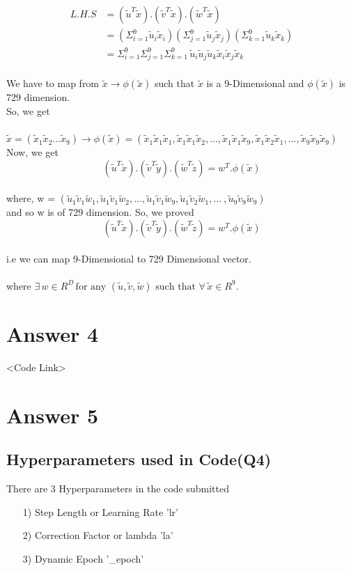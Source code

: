 \documentclass{article}
\begin{document}
\begin{align*} 
L.H.S & = (\tilde{u}^T\tilde{x}).(\tilde{v}^T\tilde{x}).(\tilde{w}^T\tilde{x})\\
& = (\Sigma_{i=1}^9 \tilde{u}_i\tilde{x}_i)(\Sigma_{j=1}^9 \tilde{u}_j\tilde{x}_j)(\Sigma_{k=1}^9 \tilde{u}_k\tilde{x}_k)\\
& = \Sigma_{i=1}^9\Sigma_{j=1}^9\Sigma_{k=1}^9 \, \tilde{u}_i\tilde{u}_j\tilde{u}_k\tilde{x}_i\tilde{x}_j\tilde{x}_k\\
\end{align*}

We have to map from $\tilde{x} \to \phi(\tilde{x})$ such that $\tilde{x}$ is a 9-Dimensional and $\phi(\tilde{x})$ is 729 dimension.\\
So, we get\\\\
$\tilde{x} = (\tilde{x}_1\tilde{x}_2 \dots \tilde{x}_9) \to\phi(\tilde{x}) = (\tilde{x}_1\tilde{x}_1\tilde{x}_1, \tilde{x}_1\tilde{x}_1\tilde{x}_2, \dots , \tilde{x}_1\tilde{x}_1\tilde{x}_9, \tilde{x}_1\tilde{x}_2\tilde{x}_1, \dots ,\tilde{x}_9\tilde{x}_9\tilde{x}_9) $\\

Now, we get
\[(\tilde{u}^T\tilde{x}).(\tilde{v}^T\tilde{y}).(\tilde{w}^T\tilde{z}) = w^T.\phi(\tilde{x})\]\\
where, w = $(\tilde{u}_1\tilde{v}_1\tilde{w}_1, \tilde{u}_1\tilde{v}_1\tilde{w}_2, \dots , \tilde{u}_1\tilde{v}_1\tilde{w}_9, \tilde{u}_1\tilde{v}_2\tilde{w}_1, \dots\ , \tilde{u}_9\tilde{v}_9\tilde{w}_9)$\\

and so w is of 729 dimension. So, we proved\\
\[(\tilde{u}^T\tilde{x}).(\tilde{v}^T\tilde{y}).(\tilde{w}^T\tilde{z}) = w^T.\phi(\tilde{x})\]\\
i.e we can map 9-Dimensional to 729 Dimensional vector.\\\\
where $ \exists \, w \in R^D \, \text{for any } (\tilde{u},\tilde{v},\tilde{w} ) \text{ such that } \forall \, \tilde{x} \in R^9. $

\section{Answer 4}
<Code Link>
\section{Answer 5}
\label{A5}
\subsection{Hyperparameters used in Code(Q4)}
There are 3 Hyperparameters in the code submitted\\
\begin{itemize}
\item[1)] Step Length or Learning Rate 'lr'
\item[2)] Correction Factor or lambda 'la'
\item[3)] Dynamic Epoch '\_epoch'
\end{itemize}
\end{document}

